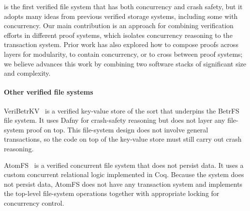 \sys is the first verified file system that has both concurrency and crash
safety, but it adopts many ideas from previous verified storage systems,
including some with concurrency. Our main contribution is an approach for
combining verification efforts in different proof systems, which isolates
concurrency reasoning to the transaction system. Prior work has also explored
how to compose proofs across layers for modularity, to contain concurrency, or
to cross between proof systems; we believe \sys advances this work by combining
two software stacks of significant size and complexity.

\paragraph{Other verified file systems}



VeriBetrKV~\cite{hance:veribetrkv} is a verified key-value store of
the sort that underpins the BetrFS~\cite{jannen:betrfs} file system. It uses Dafny for
crash-safety reasoning but does not layer any file-system proof on
top. This file-system design does not involve general transactions, so
the code on top of the key-value store must still carry out crash
reasoning.

AtomFS~\cite{zou:atomfs} is a verified concurrent file system that
does not persist data. It uses a custom concurrent relational logic
implemented in Coq.  Because the system does not persist data, AtomFS
does not have any transaction system and implements the top-level
file-system operations together with appropriate locking for
concurrency control.


